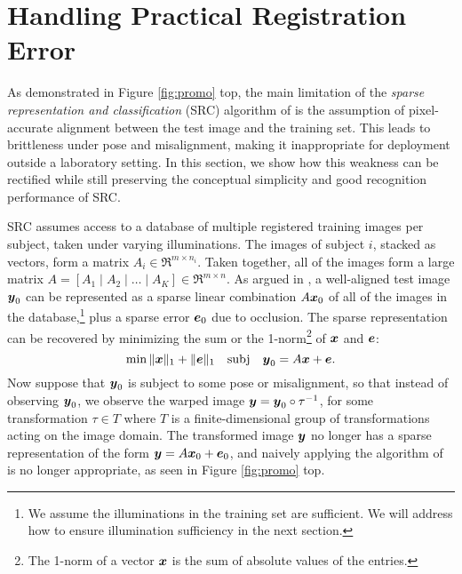 \documentclass[10pt,twocolumn,letterpaper]{article}
\newcommand{\subj}{\mathrm{subj}}
\begin{document}
\section{Handling Practical Registration Error}\label{sec:registration}\vspace{-2mm}
As demonstrated in Figure \ref{fig:promo} top, the main limitation of the {\em sparse representation and classification} (SRC) algorithm of \cite{Wright2008-PAMI} is the assumption of pixel-accurate alignment between the test image and the training set. This leads to brittleness under pose and misalignment, making it inappropriate for deployment outside a laboratory setting. In this section, we show how this weakness can be rectified while still preserving the conceptual simplicity and good recognition performance of SRC. 

SRC assumes access to a database of multiple registered training images per subject, taken under varying illuminations. The images of subject $i$, stacked as vectors, form a matrix $A_i \in \Re^{m \times n_i}$. Taken together, all of the images form a large matrix $A = [ A_1 \mid A_2 \mid \dots \mid A_K ] \in \Re^{m \times n}$. As argued in \cite{Wright2008-PAMI}, a well-aligned test image ${\boldsymbol{y}}_0$ can be represented as a sparse linear combination $A {\boldsymbol{x}}_0$ of all of the images in the database,\footnote{We assume the illuminations in the training set are sufficient. We will address how to ensure illumination sufficiency in the next section.} plus a sparse error $\boldsymbol{e}_0$ due to occlusion. The sparse representation can be recovered by minimizing the sum or the 1-norm\footnote{The 1-norm of a vector ${\boldsymbol{x}}$ is the sum of absolute values of the entries.} of ${\boldsymbol{x}}$ and $\boldsymbol{e}$:\vspace{-1mm}
\begin{equation}
\min \| \x \|_1 + \| \e\|_1 \quad \subj \quad \y_0 = A \x + \e.
\label{eqn:robust-l1}\vspace{-1mm}
\end{equation}
Now suppose that ${\boldsymbol{y}}_0$ is subject to some pose or misalignment, so that instead of observing ${\boldsymbol{y}}_0$, we observe the warped image ${\boldsymbol{y}} = {\boldsymbol{y}}_0 \circ \tau^{-1}$, for some transformation $\tau \in T$ where $T$ is a finite-dimensional group of transformations acting on the image domain.  The transformed image ${\boldsymbol{y}}$ no longer has a sparse representation of the form ${\boldsymbol{y}} = A {\boldsymbol{x}}_0 + \boldsymbol{e}_0$, and naively applying the algorithm of \cite{Wright2008-PAMI} is no longer appropriate, as seen in Figure \ref{fig:promo} top. \vspace{-3mm}
\end{document}
